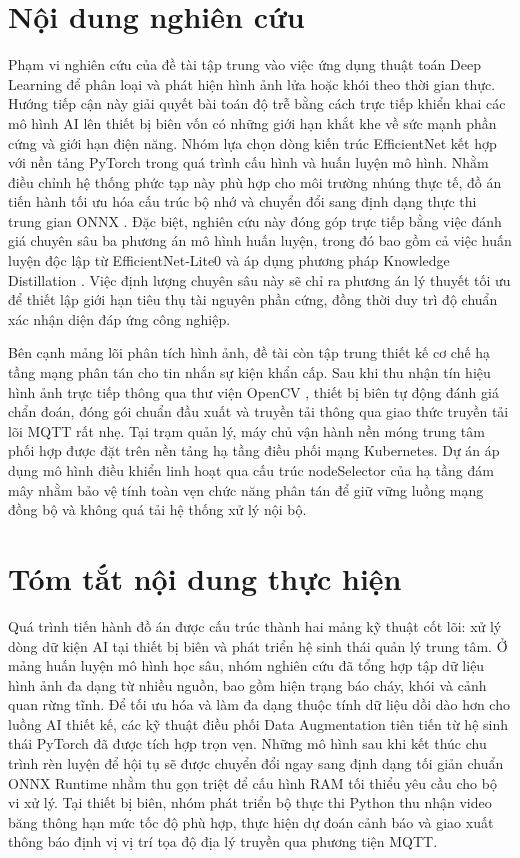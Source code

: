 \documentclass[12pt,a4paper]{report}
\begin{document}
\section{Nội dung nghiên cứu}

Phạm vi nghiên cứu của đề tài tập trung vào việc ứng dụng thuật toán Deep Learning để phân loại và phát hiện hình ảnh lửa hoặc khói theo thời gian thực. Hướng tiếp cận này giải quyết bài toán độ trễ bằng cách trực tiếp khiển khai các mô hình AI lên thiết bị biên vốn có những giới hạn khắt khe về sức mạnh phần cứng và giới hạn điện năng. Nhóm lựa chọn dòng kiến trúc EfficientNet \cite{tan2019efficientnet} kết hợp với nền tảng PyTorch trong quá trình cấu hình và huấn luyện mô hình. Nhằm điều chỉnh hệ thống phức tạp này phù hợp cho môi trường nhúng thực tế, đồ án tiến hành tối ưu hóa cấu trúc bộ nhớ và chuyển đổi sang định dạng thực thi trung gian ONNX \cite{onnxruntime}. Đặc biệt, nghiên cứu này đóng góp trực tiếp bằng việc đánh giá chuyên sâu ba phương án mô hình huấn luyện, trong đó bao gồm cả việc huấn luyện độc lập từ EfficientNet-Lite0 và áp dụng phương pháp Knowledge Distillation \cite{hinton2015distilling, gou2021survey}. Việc định lượng chuyên sâu này sẽ chỉ ra phương án lý thuyết tối ưu để thiết lập giới hạn tiêu thụ tài nguyên phần cứng, đồng thời duy trì độ chuẩn xác nhận diện đáp ứng công nghiệp.

Bên cạnh mảng lõi phân tích hình ảnh, đề tài còn tập trung thiết kế cơ chế hạ tầng mạng phân tán cho tin nhắn sự kiện khẩn cấp. Sau khi thu nhận tín hiệu hình ảnh trực tiếp thông qua thư viện OpenCV \cite{opencv}, thiết bị biên tự động đánh giá chẩn đoán, đóng gói chuẩn đầu xuất và truyền tải thông qua giao thức truyền tải lõi MQTT rất nhẹ. Tại trạm quản lý, máy chủ vận hành nền móng trung tâm phối hợp được đặt trên nền tảng hạ tầng điều phối mạng Kubernetes. Dự án áp dụng mô hình điều khiển linh hoạt qua cấu trúc nodeSelector của hạ tầng đám mây nhằm bảo vệ tính toàn vẹn chức năng phân tán để giữ vững luồng mạng đồng bộ và không quá tải hệ thống xử lý nội bộ.

\section{Tóm tắt nội dung thực hiện}

Quá trình tiến hành đồ án được cấu trúc thành hai mảng kỹ thuật cốt lõi: xử lý dòng dữ kiện AI tại thiết bị biên và phát triển hệ sinh thái quản lý trung tâm. Ở mảng huấn luyện mô hình học sâu, nhóm nghiên cứu đã tổng hợp tập dữ liệu hình ảnh đa dạng từ nhiều nguồn, bao gồm hiện trạng báo cháy, khói và cảnh quan rừng tĩnh. Để tối ưu hóa và làm đa dạng thuộc tính dữ liệu dồi dào hơn cho luồng AI thiết kế, các kỹ thuật điều phối Data Augmentation tiên tiến từ hệ sinh thái PyTorch đã được tích hợp trọn vẹn. Những mô hình sau khi kết thúc chu trình rèn luyện để hội tụ sẽ được chuyển đổi ngay sang định dạng tối giản chuẩn ONNX Runtime nhằm thu gọn triệt để cấu hình RAM tối thiểu yêu cầu cho bộ vi xử lý. Tại thiết bị biên, nhóm phát triển bộ thực thi Python thu nhận video băng thông hạn mức tốc độ phù hợp, thực hiện dự đoán cảnh báo và giao xuất thông báo định vị vị trí tọa độ địa lý truyền qua phương tiện MQTT.
\end{document}
